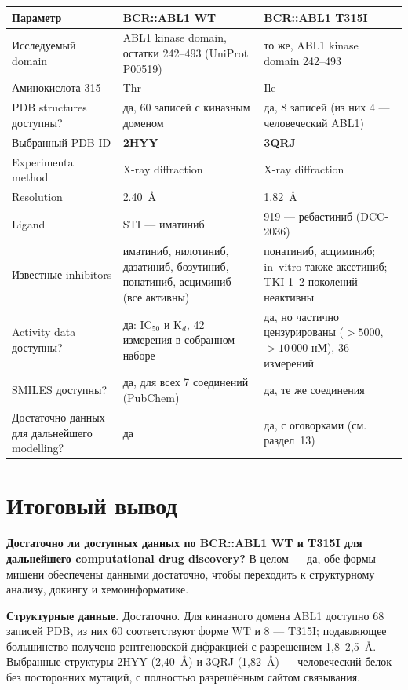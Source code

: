 \documentclass[12pt,a4paper]{article}
\begin{document}
\begin{center}
\begin{tabular}{L{4.4cm}L{5.0cm}L{5.0cm}}
\toprule
\textbf{Параметр} & \textbf{BCR::ABL1 WT} & \textbf{BCR::ABL1 T315I} \\
\midrule
Исследуемый domain & ABL1 kinase domain, остатки 242--493 (UniProt P00519) & то же, ABL1 kinase domain 242--493 \\
Аминокислота 315 & Thr & Ile \\
PDB structures доступны? & да, 60 записей с киназным доменом & да, 8 записей (из них 4 --- человеческий ABL1) \\
Выбранный PDB ID & \textbf{2HYY} & \textbf{3QRJ} \\
Experimental method & X-ray diffraction & X-ray diffraction \\
Resolution & 2.40~\AA & 1.82~\AA \\
Ligand & STI --- иматиниб & 919 --- ребастиниб (DCC-2036) \\
Известные inhibitors & иматиниб, нилотиниб, дазатиниб, бозутиниб, понатиниб, асциминиб (все активны) & понатиниб, асциминиб; in~vitro также аксетиниб; TKI 1--2 поколений неактивны \\
Activity data доступны? & да: IC$_{50}$ и K$_d$, 42 измерения в собранном наборе & да, но частично цензурированы ($>5000$, $>10\,000$ нМ), 36 измерений \\
SMILES доступны? & да, для всех 7 соединений (PubChem) & да, те же соединения \\
Достаточно данных для дальнейшего modelling? & да & да, с оговорками (см. раздел~13) \\
\bottomrule
\end{tabular}
\end{center}

\section{Итоговый вывод}

\textbf{Достаточно ли доступных данных по BCR::ABL1 WT и T315I для дальнейшего
computational drug discovery?} В целом --- да, обе формы мишени обеспечены данными
достаточно, чтобы переходить к структурному анализу, докингу и хемоинформатике.

\medskip
\noindent\textbf{Структурные данные.} Достаточно. Для киназного домена ABL1 доступно
68 записей PDB, из них 60 соответствуют форме WT и 8 --- T315I; подавляющее большинство
получено рентгеновской дифракцией с разрешением 1{,}8--2{,}5~\AA. Выбранные структуры
2HYY (2{,}40~\AA) и 3QRJ (1{,}82~\AA) --- человеческий белок без посторонних мутаций,
с полностью разрешённым сайтом связывания.
\end{document}
